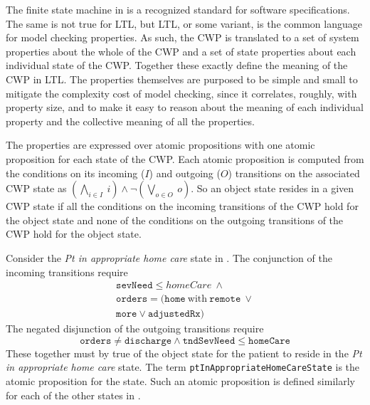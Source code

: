 The finite state machine in  is a recognized standard for software specifications.
The same is not true for LTL, but LTL, or some variant, is the common language for model checking properties.
As such, the CWP is translated to a set of system properties about the whole of the CWP and a set of state properties about each individual state of the CWP.
Together these exactly define the meaning of the CWP in LTL.
The properties themselves are purposed to be simple and small to mitigate the complexity cost of model checking, since it correlates, roughly, with property size, and to make it easy to reason about the meaning of each individual property and the collective meaning of all the properties. 

The properties are expressed over atomic propositions with one atomic proposition for each state of the CWP.
Each atomic proposition is computed from the conditions on its incoming ($I$) and outgoing ($O$) transitions on the associated CWP state as $(\bigwedge_{i \in I}\ i) \wedge \neg(\bigvee_{o \in O}\ o)$.
So an object state resides in a given CWP state if all the conditions on the incoming transitions of the CWP hold for the object state and none of the conditions on the outgoing transitions of the CWP hold for the object state.

Consider the \emph{Pt in appropriate home care} state in . The conjunction of the incoming transitions require
%
\[
\begin{array}{l}
  \mathtt{sevNeed} \le homeCare\ \wedge\ \\
  \mathtt{orders} = (\mathtt{home}\ \mathrm{with}\ \mathtt{remote}\ \vee \\
                    \mathtt{more} \vee \mathtt{adjustedRx})
\end{array}
\]
%
The negated disjunction of the outgoing transitions require
%
\[
  \mathtt{orders} \neq \mathtt{discharge} \wedge \mathtt{tndSevNeed} \le \mathtt{homeCare}
\]
%
\noindent These together must by true of the object state for the patient to reside in the \emph{Pt in appropriate home care} state.
The term \texttt{ptInAppropriateHomeCareState} is the atomic proposition for the state.
Such an atomic proposition is defined similarly for each of the other states in .


